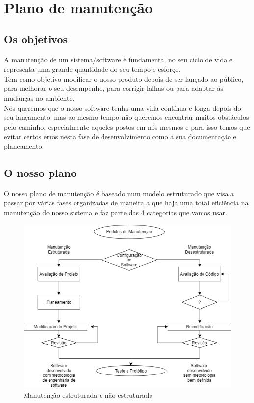 \chapter{Plano de manutenção}
\label{plano_de_manutenção}
\section{Os objetivos}
A manutenção de um sistema/software é fundamental no seu ciclo de vida e representa uma grande quantidade do seu tempo e esforço.\\
Tem como objetivo modificar o nosso produto depois de ser lançado ao público, para melhorar o seu desempenho, para corrigir falhas ou para adaptar ás mudanças no ambiente.\\
Nós queremos que o nosso software tenha uma vida contínua e longa depois do seu lançamento, mas ao mesmo tempo não queremos encontrar muitos obstáculos pelo caminho, especialmente aqueles postos em nós mesmos e para isso temos que evitar certos erros nesta fase de desenvolvimento como a sua documentação e planeamento.
\section{O nosso plano}
O nosso plano de manutenção é baseado num modelo estruturado que visa a passar por várias fases organizadas de maneira a que haja uma total eficiência na manutenção do nosso sistema e faz parte das 4 categorias que vamos usar.

\begin{figure}[H]
	\centering
	\includegraphics[width=15cm]{Pedidos_Manutencao}
	\caption{Manutenção estruturada e não estruturada}
	\label{fig:Pedidos_Manutencao}
\end{figure}

